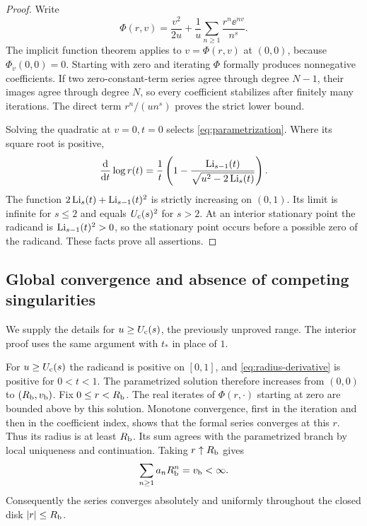\begin{proof}
Write
\[
 \Phi(r,v)=\frac{v^2}{2u}+\frac1u\sum_{n\ge1}\frac{r^n\ee^{nv}}{n^s}.
\]
The implicit function theorem applies to $v=\Phi(r,v)$ at $(0,0)$,
because $\Phi_v(0,0)=0$.  Starting with zero and iterating $\Phi$
formally produces nonnegative coefficients.  If two zero-constant-term
series agree through degree $N-1$, their images agree through degree
$N$, so every coefficient stabilizes after finitely many iterations.
The direct term $r^n/(un^s)$ proves the strict lower bound.

Solving the quadratic at $v=0,t=0$ selects \eqref{eq:parametrization}.
Where its square root is positive,
\begin{equation}\label{eq:radius-derivative}
 \frac{\mathrm d}{\mathrm d t}\log r(t)=\frac1t
 \left(1-\frac{\operatorname{Li}_{s-1}(t)}{\sqrt{u^2-2\operatorname{Li}_s(t)}}\right).
\end{equation}
The function $2\operatorname{Li}_s(t)+\operatorname{Li}_{s-1}(t)^2$ is strictly increasing on
$(0,1)$.  Its limit is infinite for $s\le2$ and equals $U_{\mathrm c}(s)^2$
for $s>2$.  At an interior stationary point the radicand is
$\operatorname{Li}_{s-1}(t)^2>0$, so the stationary point occurs before a possible
zero of the radicand.  These facts prove all assertions.
\end{proof}

\subsection{Global convergence and absence of competing singularities}

We supply the details for $u\ge U_{\mathrm c}(s)$, the previously unproved
range.  The interior proof uses the same argument with $t_*$ in
place of $1$.

For $u\ge U_{\mathrm c}(s)$ the radicand is positive on $[0,1]$, and
\eqref{eq:radius-derivative} is positive for $0<t<1$.
The parametrized solution therefore increases from $(0,0)$ to
$(R_{\mathrm b},v_{\mathrm b})$.  Fix $0\le r<R_{\mathrm b}$.  The real iterates of $\Phi(r,\cdot)$
starting at zero are bounded above by this solution.  Monotone
convergence, first in the iteration and then in the coefficient
index, shows that the formal series converges at this $r$.
Thus its radius is at least $R_{\mathrm b}$.  Its sum agrees with the
parametrized branch by local uniqueness and continuation.  Taking
$r\uparrow R_{\mathrm b}$ gives
\begin{equation}\label{eq:boundary-sum}
 \sum_{n\ge1}a_nR_{\mathrm b}^n=v_{\mathrm b}<\infty.
\end{equation}
Consequently the series converges absolutely and uniformly throughout
the closed disk $|r|\le R_{\mathrm b}$.

